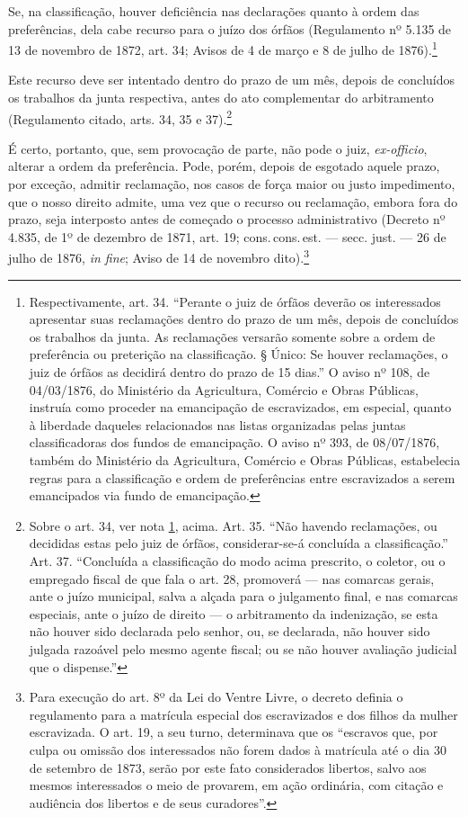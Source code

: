 Se, na classificação, houver deficiência nas declarações quanto à ordem
das preferências, dela cabe recurso para o juízo dos órfãos (Regulamento
nº 5.135 de 13 de novembro de 1872, art. 34; Avisos de 4 de março e 8 de
julho de 1876).\footnote{Respectivamente, art. 34. ``Perante o juiz de \label{art34}
  órfãos deverão os interessados apresentar suas reclamações dentro do
  prazo de um mês, depois de concluídos os trabalhos da junta. As
  reclamações versarão somente sobre a ordem de preferência ou
  preterição na classificação. § Único: Se houver reclamações, o juiz de
  órfãos as decidirá dentro do prazo de 15 dias.'' O aviso nº 108, de
  04/03/1876, do Ministério da Agricultura, Comércio e Obras Públicas,
  instruía como proceder na emancipação de escravizados, em especial,
  quanto à liberdade daqueles relacionados nas listas organizadas pelas
  juntas classificadoras dos fundos de emancipação. O aviso nº 393, de
  08/07/1876, também do Ministério da Agricultura, Comércio e Obras
  Públicas, estabelecia regras para a classificação e ordem de
  preferências entre escravizados a serem emancipados via fundo de
  emancipação.}

Este recurso deve ser intentado dentro do prazo de um mês, depois de
concluídos os trabalhos da junta respectiva, antes do ato complementar
do arbitramento (Regulamento citado, arts. 34, 35 e 37).\footnote{
  Sobre o art. 34, ver nota \ref{art34}, acima. Art. 35. ``Não havendo reclamações, ou
  decididas estas pelo juiz de órfãos, considerar-se-á concluída a
  classificação.'' Art. 37. ``Concluída a classificação do modo acima
  prescrito, o coletor, ou o empregado fiscal de que fala o art. 28,
  promoverá --- nas comarcas gerais, ante o juízo municipal, salva a
  alçada para o julgamento final, e nas comarcas especiais, ante o juízo
  de direito --- o arbitramento da indenização, se esta não houver sido
  declarada pelo senhor, ou, se declarada, não houver sido julgada
  razoável pelo mesmo agente fiscal; ou se não houver avaliação judicial
  que o dispense.''}

É certo, portanto, que, sem provocação de parte, não pode o juiz,
\emph{ex-officio}, alterar a ordem da preferência. Pode, porém, depois
de esgotado aquele prazo, por exceção, admitir reclamação, nos casos de
força maior ou justo impedimento, que o nosso direito admite, uma vez
que o recurso ou reclamação, embora fora do prazo, seja interposto antes
de começado o processo administrativo (Decreto nº 4.835, de 1º de
dezembro de 1871, art. 19; cons.\,cons.\,est. --- secc. just. --- 26 de julho
de 1876, \emph{in fine}; Aviso de 14 de novembro dito).\footnote{Para
  execução do art. 8º da Lei do Ventre Livre, o decreto definia o
  regulamento para a matrícula especial dos escravizados e dos filhos da
  mulher escravizada. O art. 19, a seu turno, determinava que os
  ``escravos que, por culpa ou omissão dos interessados não forem dados à
  matrícula até o dia 30 de setembro de 1873, serão por este fato
  considerados libertos, salvo aos mesmos interessados o meio de
  provarem, em ação ordinária, com citação e audiência dos libertos e de
  seus curadores''.}

